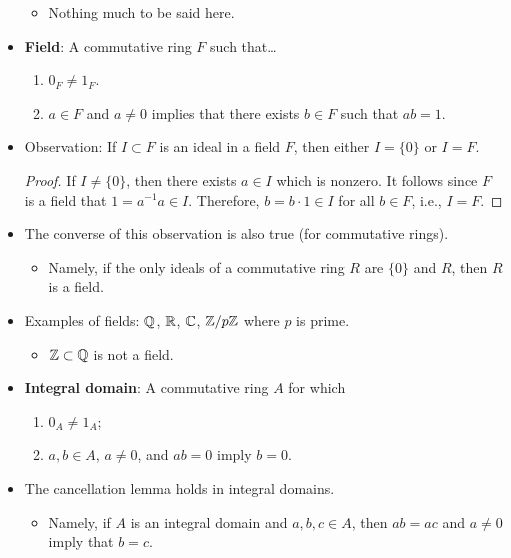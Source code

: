 \documentclass[../notes.tex]{subfiles}
\begin{document}
\begin{itemize}
    \begin{itemize}
        \item Nothing much to be said here.
    \end{itemize}
    \item \textbf{Field}: A commutative ring $F$ such that\dots
    \begin{enumerate}[label={(\roman*)}]
        \item $0_F\neq 1_F$.
        \item $a\in F$ and $a\neq 0$ implies that there exists $b\in F$ such that $ab=1$.
    \end{enumerate}
    \item Observation: If $I\subset F$ is an ideal in a field $F$, then either $I=\{0\}$ or $I=F$.
    \begin{proof}
        If $I\neq\{0\}$, then there exists $a\in I$ which is nonzero. It follows since $F$ is a field that $1=a^{-1}a\in I$. Therefore, $b=b\cdot 1\in I$ for all $b\in F$, i.e., $I=F$.
    \end{proof}
    \item The converse of this observation is also true (for commutative rings).
    \begin{itemize}
        \item Namely, if the only ideals of a commutative ring $R$ are $\{0\}$ and $R$, then $R$ is a field.
    \end{itemize}
    \item Examples of fields: $\mathbb{Q}$, $\mathbb{R}$, $\mathbb{C}$, $\mathbb{Z}/p\mathbb{Z}$ where $p$ is prime.
    \begin{itemize}
        \item $\mathbb{Z}\subset\mathbb{Q}$ is not a field.
    \end{itemize}
    \item \textbf{Integral domain}: A commutative ring $A$ for which
    \begin{enumerate}
        \item $0_A\neq 1_A$;
        \item $a,b\in A$, $a\neq 0$, and $ab=0$ imply $b=0$.
    \end{enumerate}
    \item The cancellation lemma holds in integral domains.
    \begin{itemize}
        \item Namely, if $A$ is an integral domain and $a,b,c\in A$, then $ab=ac$ and $a\neq 0$ imply that $b=c$.
    \end{itemize}
\end{itemize}
\end{document}
